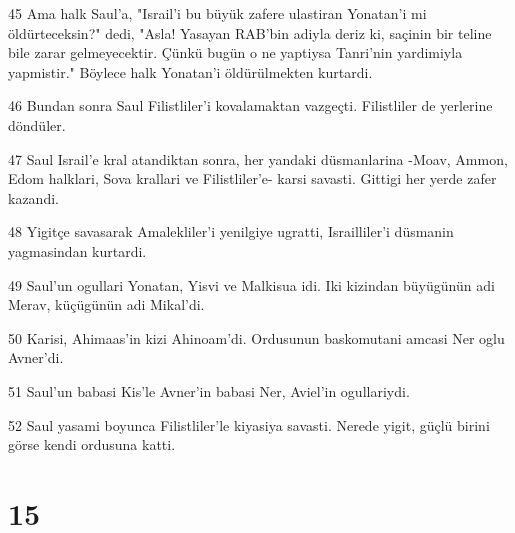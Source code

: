 \par 45 Ama halk Saul'a, "Israil'i bu büyük zafere ulastiran Yonatan'i mi öldürteceksin?" dedi, "Asla! Yasayan RAB'bin adiyla deriz ki, saçinin bir teline bile zarar gelmeyecektir. Çünkü bugün o ne yaptiysa Tanri'nin yardimiyla yapmistir." Böylece halk Yonatan'i öldürülmekten kurtardi.
\par 46 Bundan sonra Saul Filistliler'i kovalamaktan vazgeçti. Filistliler de yerlerine döndüler.
\par 47 Saul Israil'e kral atandiktan sonra, her yandaki düsmanlarina -Moav, Ammon, Edom halklari, Sova krallari ve Filistliler'e- karsi savasti. Gittigi her yerde zafer kazandi.
\par 48 Yigitçe savasarak Amalekliler'i yenilgiye ugratti, Israilliler'i düsmanin yagmasindan kurtardi.
\par 49 Saul'un ogullari Yonatan, Yisvi ve Malkisua idi. Iki kizindan büyügünün adi Merav, küçügünün adi Mikal'di.
\par 50 Karisi, Ahimaas'in kizi Ahinoam'di. Ordusunun baskomutani amcasi Ner oglu Avner'di.
\par 51 Saul'un babasi Kis'le Avner'in babasi Ner, Aviel'in ogullariydi.
\par 52 Saul yasami boyunca Filistliler'le kiyasiya savasti. Nerede yigit, güçlü birini görse kendi ordusuna katti.

\chapter{15}

